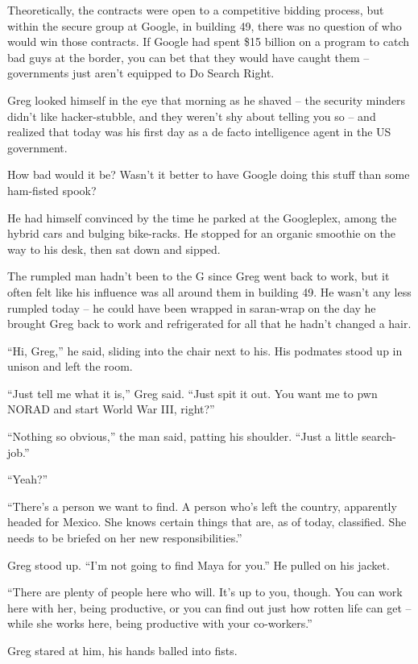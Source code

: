 Theoretically, the contracts were open to a competitive bidding 
process, but within the secure group at Google, in building 49, there 
was no question of who would win those contracts. If Google had spent 
\$15 billion on a program to catch bad guys at the border, you can bet 
that they would have caught them -- governments just aren't equipped to 
Do Search Right.

Greg looked himself in the eye that morning as he shaved -- the 
security minders didn't like hacker-stubble, and they weren't shy about 
telling you so -- and realized that today was his first day as a de 
facto intelligence agent in the US government.

How bad would it be? Wasn't it better to have Google doing this stuff 
than some ham-fisted spook?

He had himself convinced by the time he parked at the Googleplex, among 
the hybrid cars and bulging bike-racks. He stopped for an organic 
smoothie on the way to his desk, then sat down and sipped.

The rumpled man hadn't been to the G since Greg went back to work, but 
it often felt like his influence was all around them in building 49. He 
wasn't any less rumpled today -- he could have been wrapped in 
saran-wrap on the day he brought Greg back to work and refrigerated for 
all that he hadn't changed a hair.

“Hi, Greg,” he said, sliding into the chair next to his. His 
podmates stood up in unison and left the room.

“Just tell me what it is,” Greg said. “Just spit it out. You want 
me to pwn NORAD and start World War III, right?”

“Nothing so obvious,” the man said, patting his shoulder. “Just a 
little search-job.”

“Yeah?”

“There's a person we want to find. A person who's left the country, 
apparently headed for Mexico. She knows certain things that are, as of 
today, classified. She needs to be briefed on her new 
responsibilities.”

Greg stood up. “I'm not going to find Maya for you.” He pulled on 
his jacket.

“There are plenty of people here who will. It's up to you, though. 
You can work here with her, being productive, or you can find out just 
how rotten life can get -- while she works here, being productive with 
your co-workers.”

Greg stared at him, his hands balled into fists.

